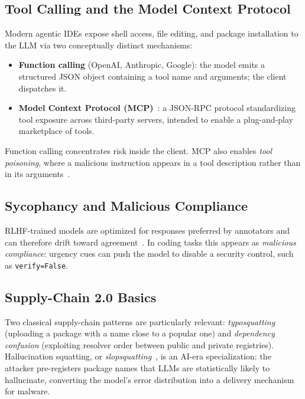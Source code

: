 \documentclass[twocolumn]{svjour3}
\begin{document}
\subsection{Tool Calling and the Model Context Protocol}
Modern agentic IDEs expose shell access, file editing, and package installation to the LLM via two conceptually distinct mechanisms:
\begin{itemize}
\item \textbf{Function calling} (OpenAI, Anthropic, Google): the model emits a structured JSON object containing a tool name and arguments; the client dispatches it.
\item \textbf{Model Context Protocol (MCP)}~\cite{anthropic2024mcp}: a JSON-RPC protocol standardizing tool exposure across third-party servers, intended to enable a plug-and-play marketplace of tools.
\end{itemize}
\begin{sloppypar}
Function calling concentrates risk inside the client. MCP also enables \emph{tool poisoning}, where a malicious instruction appears in a tool description rather than in its arguments~\cite{gaire2025mcpsok, maloyan2026breaking}.
\end{sloppypar}

\subsection{Sycophancy and Malicious Compliance}
\begin{sloppypar}
RLHF-trained models are optimized for responses preferred by annotators and can therefore drift toward agreement~\cite{hong2025sycophancy}. In coding tasks this appears as \emph{malicious compliance}: urgency cues can push the model to disable a security control, such as \texttt{verify=False}.
\end{sloppypar}

\subsection{Supply-Chain 2.0 Basics}
Two classical supply-chain patterns are particularly relevant: \emph{typosquatting} (uploading a package with a name close to a popular one) and \emph{dependency confusion} (exploiting resolver order between public and private registries). Hallucination squatting, or \emph{slopsquatting}~\cite{larson2025slopsquatting, spracklen2025package, krishna2025phantoms}, is an AI-era specialization: the attacker pre-registers package names that LLMs are statistically likely to hallucinate, converting the model's error distribution into a delivery mechanism for malware.
\end{document}
